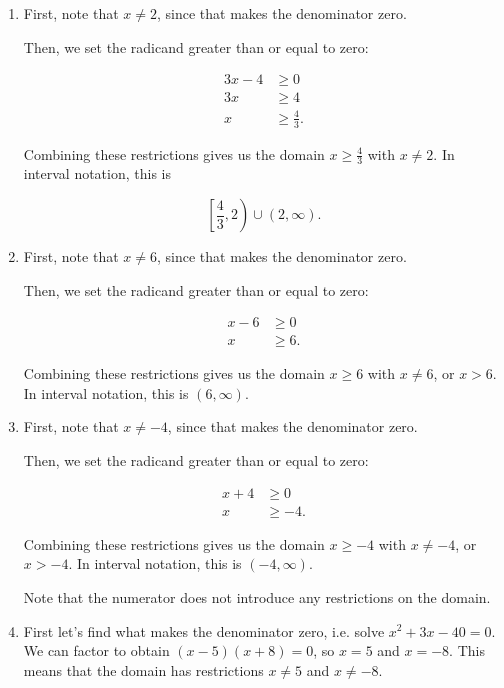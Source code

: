 \documentclass{ximera}
\begin{document}
\begin{explanation}
\begin{enumerate}
	\item First, note that $x \ne 2$, since that makes the denominator zero.

Then, we set the radicand greater than or equal to zero:

\begin{align*}3x-4&\ge 0 \\ 3x & \ge 4 \\ x & \ge \frac{4}{3}. \end{align*}

Combining these restrictions gives us the domain $x \ge \frac{4}{3}$ with $x \ne 2$. In interval notation, this is

$$\left[\frac{4}{3}, 2\right) \cup (2, \infty).$$

	\item First, note that $x \ne 6$, since that makes the denominator zero.

Then, we set the radicand greater than or equal to zero:

\begin{align*}x-6&\ge 0 \\ x & \ge 6. \end{align*}

Combining these restrictions gives us the domain $x \ge 6$ with $x \ne 6$, or $x > 6$. In interval notation, this is $(6, \infty)$.

	\item First, note that $x \ne -4$, since that makes the denominator zero.

Then, we set the radicand greater than or equal to zero:

\begin{align*}x + 4&\ge 0 \\ x & \ge -4. \end{align*}

Combining these restrictions gives us the domain $x \ge -4$ with $x \ne -4$, or $x > -4$. In interval notation, this is $(-4, \infty)$.

Note that the numerator does not introduce any restrictions on the domain.  

	\item First let's find what makes the denominator zero, i.e. solve $x^2 + 3x - 40 = 0$. We can factor to obtain $(x - 5)(x + 8) = 0$, so $x = 5$ and $x = -8$. This means that the domain has restrictions $x \ne 5$ and $x \ne -8$. 


\end{enumerate}
\end{explanation}
\end{document}
